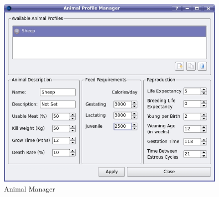    \begin{figure}[htbp]
     \includegraphics[scale=.39]{./images/animalManager.jpg}
      \caption{\label{fig:animalManager}Animal Manager}
    \end{figure}

